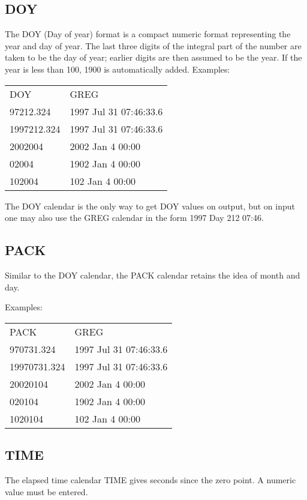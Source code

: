 \documentclass{article}
\begin{document}
\subsection{DOY}

The DOY (Day of year) format is a compact numeric format
representing the year and day of year. The last three digits
of the integral part of the number are taken to be the day
of year; earlier digits are then assumed to be the year.
If the year is less than 100, 1900 is automatically added.
Examples:
\begin{longtable}{ll}
DOY &  GREG \\
97212.324     & 1997 Jul 31 07:46:33.6\\
1997212.324   & 1997 Jul 31 07:46:33.6\\
2002004       & 2002 Jan  4 00:00\\
02004         & 1902 Jan  4 00:00\\
102004        &  102 Jan  4 00:00\\
\end{longtable}

The DOY calendar is the only way to get DOY values on output,
but on input one may also use the GREG calendar in the form
1997 Day 212 07:46.


\subsection{PACK}

Similar to the DOY calendar, the PACK calendar retains
the idea of month and day.

Examples:
\begin{longtable}{ll}
PACK &  GREG \\
970731.324     & 1997 Jul 31 07:46:33.6\\
19970731.324   & 1997 Jul 31 07:46:33.6\\
20020104       & 2002 Jan  4 00:00\\
020104         & 1902 Jan  4 00:00\\
1020104        &  102 Jan  4 00:00\\
\end{longtable}


\subsection{TIME}

The elapsed time calendar TIME gives seconds since
the zero point.
A numeric value must be entered.
\end{document}

